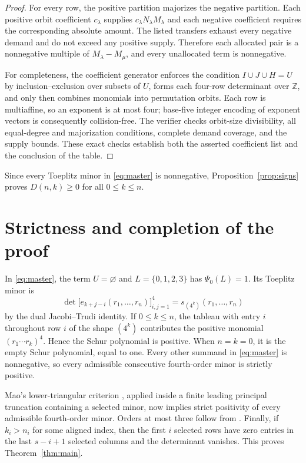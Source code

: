 \documentclass[11pt]{article}
\begin{document}
\begin{proof}
For every row, the positive partition majorizes the negative partition.  Each
positive orbit coefficient $c_\lambda$ supplies
$c_\lambda N_\lambda M_\lambda$ and each negative coefficient requires the
corresponding absolute amount.  The listed transfers exhaust every negative
demand and do not exceed any positive supply.  Therefore each allocated pair
is a nonnegative multiple of $M_\lambda-M_\mu$, and every unallocated term is
nonnegative.

For completeness, the coefficient generator enforces the condition
$I\cup J\cup H=U$ by inclusion--exclusion over subsets of $U$, forms each
four-row determinant over $\mathbb Z$, and only then combines monomials into
permutation orbits.  Each row is multiaffine, so an exponent is at most four;
base-five integer encoding of exponent vectors is consequently collision-free.
The verifier checks orbit-size divisibility, all equal-degree and majorization
conditions, complete demand coverage, and the supply bounds.  These exact
checks establish both the asserted coefficient list and the conclusion of the
table.
\end{proof}

Since every Toeplitz minor in \eqref{eq:master} is nonnegative,
Proposition~\ref{prop:signs} proves $D(n,k)\geq0$ for all $0\leq k\leq n$.

\section{Strictness and completion of the proof}

In \eqref{eq:master}, the term $U=\varnothing$ and
$L=\{0,1,2,3\}$ has $\Psi_0(L)=1$.  Its Toeplitz minor is
\[
 \det\bigl[e_{k+j-i}(r_1,\ldots,r_n)\bigr]_{i,j=1}^4
   =s_{(4^k)}(r_1,\ldots,r_n)
\]
by the dual Jacobi--Trudi identity.  If $0\leq k\leq n$, the tableau with
entry $i$ throughout row $i$ of the shape $(4^k)$ contributes the positive
monomial $(r_1\cdots r_k)^4$.  Hence the Schur polynomial is positive.  When
$n=k=0$, it is the empty Schur polynomial, equal to one.  Every other summand
in \eqref{eq:master} is nonnegative, so every admissible consecutive
fourth-order minor is strictly positive.

Mao's lower-triangular criterion
\cite[Theorem~2.5]{Mao2026}, applied inside a finite leading principal
truncation containing a selected minor, now implies strict positivity of every
admissible fourth-order minor.  Orders at most three follow from
\cite[Theorem~1.1]{Mao2026}.  Finally, if $k_i>n_i$ for some aligned index,
then the first $i$ selected rows have zero entries in the last $s-i+1$
selected columns and the determinant vanishes.  This proves
Theorem~\ref{thm:main}.
\end{document}
